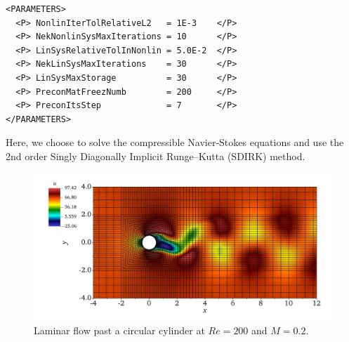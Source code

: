 \begin{lstlisting}[style=XmlStyle]
<PARAMETERS>
  <P> NonlinIterTolRelativeL2   = 1E-3    </P>
  <P> NekNonlinSysMaxIterations = 10      </P>
  <P> LinSysRelativeTolInNonlin = 5.0E-2  </P>
  <P> NekLinSysMaxIterations    = 30      </P>
  <P> LinSysMaxStorage          = 30      </P>
  <P> PreconMatFreezNumb        = 200     </P>
  <P> PreconItsStep             = 7       </P>
</PARAMETERS>
\end{lstlisting}


Here, we choose to solve the compressible Navier-Stokes equations and use the 
2nd order Singly Diagonally Implicit Runge–Kutta (SDIRK) method.
\begin{figure}[!htbp]
	\begin{center}
		\centering	
		\includegraphics[scale=0.18,trim=0 0 0 0,clip]{img/CylinderSubsonic.jpeg}
		\caption{Laminar flow past a circular cylinder at $Re=200$ and $M=0.2$.}
		\label{fig:fpcc}
	\end{center}
\end{figure}